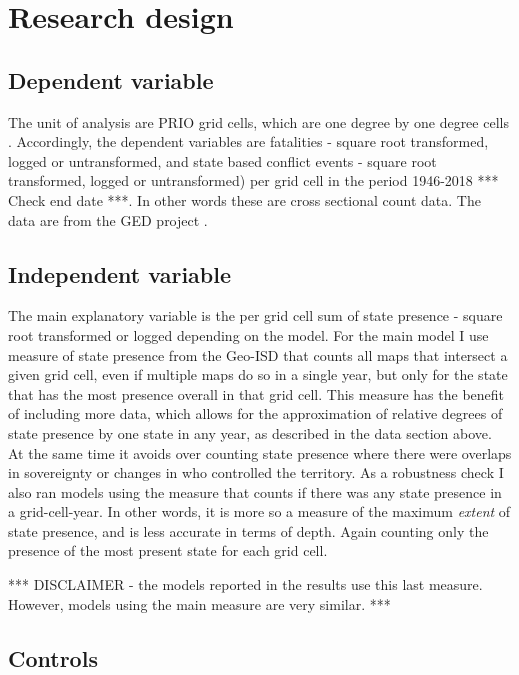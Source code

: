 \documentclass[12pt]{article}
\begin{document}

\section{Research design}

\subsection{Dependent variable}

The unit of analysis are PRIO grid cells, which are one degree by one degree
cells \citep{Tollefsen2012}. Accordingly, the dependent variables are fatalities
- square root transformed, logged or untransformed, and state based conflict
events - square root transformed, logged or untransformed) per grid cell in the
period 1946-2018 *** Check end date ***. In other words these are cross
sectional count data. The data are from the GED project \citep{Sundberg2013}.

\subsection{Independent variable}

The main explanatory variable is the per grid cell sum of state presence -
square root transformed or logged depending on the model. For the main model I
use measure of state presence from the Geo-ISD that counts all maps that
intersect a given grid cell, even if multiple maps do so in a single year, but
only for the state that has the most presence overall in that grid cell. This
measure has the benefit of including more data, which allows for the
approximation of relative degrees of state presence by one state in any year, as
described in the data section above. At the same time it avoids over counting
state presence where there were overlaps in sovereignty or changes in who
controlled the territory. As a robustness check I also ran models using the
measure that counts if there was any state presence in a grid-cell-year. In
other words, it is more so a measure of the maximum \textit{extent} of state
presence, and is less accurate in terms of depth. Again counting only the
presence of the most present state for each grid cell.

*** DISCLAIMER - the models reported in the results use this last measure.
However, models using the main measure are very similar. *** 

\subsection{Controls}
\end{document}
